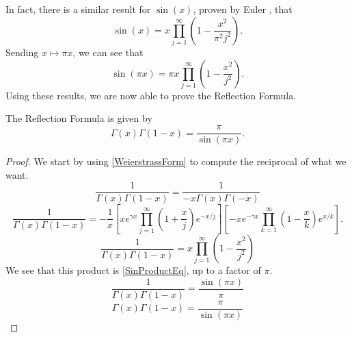 In fact, there is a similar result for $\sin(x)$, proven by Euler \cite{SinProduct}, that
$$\sin (x) = x \prod_{j=1}^\infty \left(1 - \frac{x^2}{\pi^2 j^2}\right).$$
Sending $x \mapsto \pi x$, we can see that
\begin{equation}\label{SinProductEq}
\sin (\pi x) = \pi x \prod_{j=1}^\infty \left(1 - \frac{x^2}{j^2}\right).
\end{equation}
Using these results, we are now able to prove the Reflection Formula.

\begin{thm}
The Reflection Formula is given by
\begin{equation}\label{ReflectionFormula}
\boxed{\Gamma(x)\Gamma(1-x) = \frac{\pi}{\sin (\pi x)}}.
\end{equation}
\end{thm}

\begin{proof}
We start by using \eqref{WeierstrassForm} to compute the reciprocal of what we want.
$$\frac{1}{\Gamma(x)\Gamma(1-x)} = \frac{1}{-x\Gamma(x)\Gamma(-x)}$$
$$\frac{1}{\Gamma(x)\Gamma(1-x)} = -\frac{1}{x} \left[ xe^{\gamma x} \prod_{j=1}^\infty \left(1 + \frac{x}{j}\right) e^{-x/j} \right] \left[ -x e^{-\gamma x} \prod_{k=1}^\infty \left(1 - \frac{x}{k}\right) e^{x/k} \right].$$
$$\frac{1}{\Gamma(x)\Gamma(1-x)} = x\prod_{j=1}^\infty \left(1 - \frac{x^2}{j^2}\right)$$
We see that this product is \eqref{SinProductEq}, up to a factor of $\pi$.
$$\frac{1}{\Gamma(x)\Gamma(1-x)} = \frac{\sin (\pi x)}{\pi}$$
$$\Gamma(x) \Gamma(1-x) = \frac{\pi}{\sin (\pi x)}$$
\end{proof}